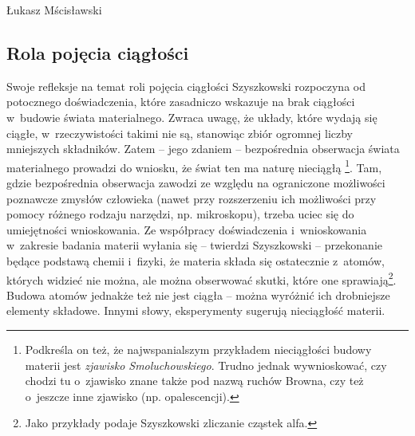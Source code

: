 \begin{artplenv}{Łukasz Mścisławski}
\subsection{Rola pojęcia ciągłości}
Swoje refleksje na temat roli pojęcia ciągłości Szyszkowski rozpoczyna od potocznego doświadczenia, które zasadniczo wskazuje na brak ciągłości w~budowie świata materialnego. Zwraca uwagę, że układy, które wydają się ciągłe, w~rzeczywistości takimi nie są, stanowiąc zbiór ogromnej liczby mniejszych składników. Zatem -- jego zdaniem -- bezpośrednia obserwacja świata materialnego prowadzi do wniosku, że świat ten ma naturę nieciągłą
\parencite[por.][s.~45–46]{szyszkowski_o_1916}%
\footnote{Podkreśla on też, że najwspanialszym przykładem nieciągłości budowy materii jest \textit{zjawisko Smoluchowskiego}. Trudno jednak wywnioskować, czy chodzi tu o~zjawisko znane także pod nazwą ruchów Browna, czy też o~jeszcze inne zjawisko (np. opalescencji).}. Tam, gdzie bezpośrednia obserwacja zawodzi ze względu na ograniczone możliwości poznawcze zmysłów człowieka (nawet przy rozszerzeniu ich możliwości przy pomocy różnego rodzaju narzędzi, np. mikroskopu), trzeba uciec się do umiejętności wnioskowania. Ze współpracy doświadczenia i~wnioskowania w~zakresie badania materii wyłania się -- twierdzi Szyszkowski -- przekonanie będące podstawą chemii i~fizyki, że materia składa się ostatecznie z~atomów, których widzieć nie można, ale można obserwować skutki, które one sprawiają\footnote{Jako przykłady podaje Szyszkowski zliczanie cząstek alfa.}. Budowa atomów jednakże też nie jest ciągła -- można wyróżnić ich drobniejsze elementy składowe. Innymi słowy, eksperymenty sugerują nieciągłość materii.


\end{artplenv}
